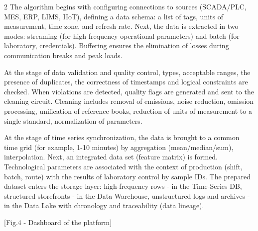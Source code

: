 \begin{multicols}{2}
The algorithm begins with configuring connections to sources (SCADA/PLC,
MES, ERP, LIMS, IIoT), defining a data schema: a list of tags, units of
measurement, time zone, and refresh rate. Next, the data is extracted in
two modes: streaming (for high-frequency operational parameters) and
batch (for laboratory, credentials). Buffering ensures the elimination
of losses during communication breaks and peak loads.

At the stage of data validation and quality control, types, acceptable
ranges, the presence of duplicates, the correctness of timestamps and
logical constraints are checked. When violations are detected, quality
flags are generated and sent to the cleaning circuit. Cleaning includes
removal of emissions, noise reduction, omission processing, unification
of reference books, reduction of units of measurement to a single
standard, normalization of parameters.

At the stage of time series synchronization, the data is brought to a
common time grid (for example, 1-10 minutes) by aggregation
(mean/median/sum), interpolation. Next, an integrated data set (feature
matrix) is formed. Technological parameters are associated with the
context of production (shift, batch, route) with the results of
laboratory control by sample IDs. The prepared dataset enters the
storage layer: high-frequency rows - in the Time-Series DB, structured
storefronts - in the Data Warehouse, unstructured logs and archives - in
the Data Lake with chronology and traceability (data lineage).
\end{multicols}

[Fig.4 - Dashboard of the platform]

